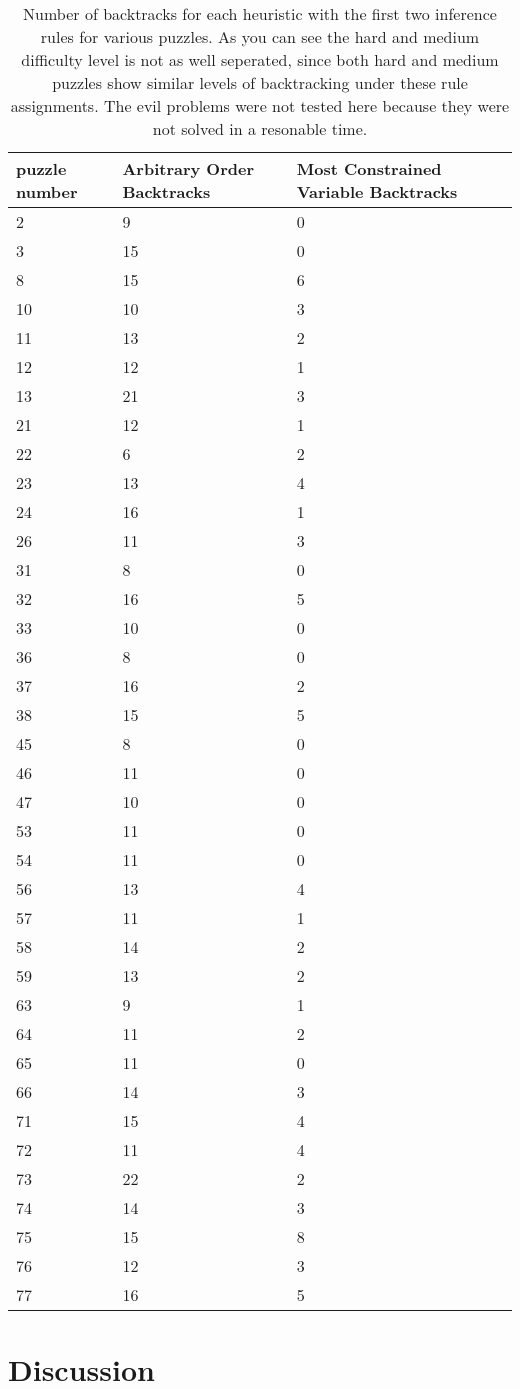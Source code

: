 \documentclass{article}
\begin{document}
\begin{table}[h]
  \centering
  \begin{tabular}{lll}
   \toprule
    puzzle number& Arbitrary Order Backtracks & Most Constrained Variable Backtracks\\
    \midrule
    2&9&0\\
    \midrule
    3&15&0\\
    \midrule
    8&15&6\\
    \midrule
    10&10&3\\
    \midrule
    11&13&2\\
    \midrule
    12&12&1\\
    \midrule
    13&21&3\\
    \midrule
    21&12&1\\
    \midrule
    22&6&2\\
    \midrule
    23&13&4\\
    \midrule
    24&16&1\\
    \midrule
    26&11&3\\
    \midrule
    31&8&0\\
    \midrule
    32&16&5\\
    \midrule
    33&10&0\\
    \midrule
    36&8&0\\
    \midrule
    37&16&2\\
    \midrule
    38&15&5\\
    \midrule
    45&8&0\\
    \midrule
    46&11&0\\
    \midrule
    47&10&0\\
    \midrule
    53&11&0\\
    \midrule
    54&11&0\\
    \midrule
    56&13&4\\
    \midrule
    57&11&1\\
    \midrule
    58&14&2\\
    \midrule
    59&13&2\\
    \midrule
    63&9&1\\
    \midrule
    64&11&2\\
    \midrule
    65&11&0\\
    \midrule
    66&14&3\\
    \midrule
    71&15&4\\
    \midrule
    72&11&4\\
    \midrule
    73&22&2\\
    \midrule
    74&14&3\\
    \midrule
    75&15&8\\
    \midrule
    76&12&3\\
    \midrule
    77&16&5\\
           \bottomrule
  \end{tabular}
  \caption{Number of backtracks for each heuristic with the first two inference rules for various puzzles. As you can see the hard and medium difficulty level is not as well seperated, since both hard and medium puzzles show similar levels of backtracking under these rule assignments. The evil problems were not tested here because they were not solved in a resonable time.  }
  \label{tab:firstInferences}
\end{table}
\section{Discussion}



  
\end{document}
